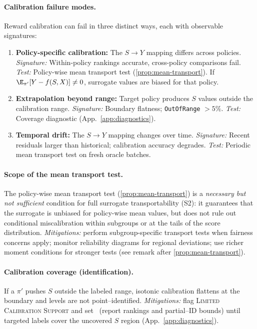 \paragraph{Calibration failure modes.}
Reward calibration can fail in three distinct ways, each with observable signatures:
\begin{enumerate}[leftmargin=*,nosep]
\item \textbf{Policy-specific calibration:} The $S \to Y$ mapping differs across policies.
\emph{Signature:} Within-policy rankings accurate, cross-policy comparisons fail.
\emph{Test:} Policy-wise mean transport test (\cref{prop:mean-transport}). If $\E_{\pi'}[Y - f(S,X)] \neq 0$, surrogate values are biased for that policy.
\item \textbf{Extrapolation beyond range:} Target policy produces $S$ values outside the calibration range.
\emph{Signature:} Boundary flatness; \texttt{OutOfRange} $> 5\%$.
\emph{Test:} Coverage diagnostic (App.~\ref{app:diagnostics}).
\item \textbf{Temporal drift:} The $S \to Y$ mapping changes over time.
\emph{Signature:} Recent residuals larger than historical; calibration accuracy degrades.
\emph{Test:} Periodic mean transport test on fresh oracle batches.
\end{enumerate}

\paragraph{Scope of the mean transport test.}
The policy-wise mean transport test (\cref{prop:mean-transport}) is a \emph{necessary but not sufficient} condition for full surrogate transportability (S2): it guarantees that the surrogate is unbiased for policy-wise mean values, but does not rule out conditional miscalibration within subgroups or at the tails of the score distribution.
\emph{Mitigations:} perform subgroup-specific transport tests when fairness concerns apply; monitor reliability diagrams for regional deviations; use richer moment conditions for stronger tests (see remark after \cref{prop:mean-transport}).

\paragraph{Calibration coverage (identification).}
If a $\pi'$ pushes $S$ outside the labeled range, isotonic calibration flattens at the boundary and levels are not point–identified.
\emph{Mitigations:} flag \textsc{Limited Calibration Support} and set \RefuseLevel\ (report rankings and partial–ID bounds) until targeted labels cover the uncovered $S$ region (App.~\ref{app:diagnostics}).

